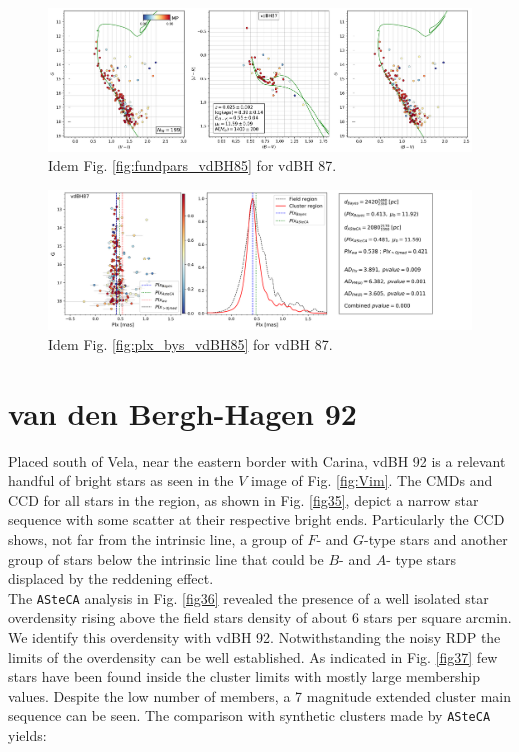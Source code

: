 \documentclass[draft]{aa}
\begin{document}
\begin{figure}[ht]
    \centering
    \includegraphics[width=\hsize]{../figs/cmds_vdbh87.png}
    \caption{Idem Fig. \ref{fig:fundpars_vdBH85} for vdBH 87.}
    \label{fig17}
\end{figure}
\begin{figure}[ht]
    \centering
    \includegraphics[width=\hsize]{../figs/plx_vdBH87.png}
    \caption{Idem Fig. \ref{fig:plx_bys_vdBH85} for vdBH 87.}
    \label{fig18}
\end{figure}




\section{van den Bergh-Hagen 92}

Placed south of Vela, near the eastern border with Carina, vdBH
92 is a relevant handful of bright stars as seen in the $V$ image of Fig.
\ref{fig:Vim}. The CMDs and CCD for all stars in the region, as shown in Fig.
\ref{fig35}, depict a narrow star sequence with some scatter at their respective
bright ends. Particularly the CCD shows, not far from the intrinsic line, a
group of $F$- and $G$-type stars and another group of stars below the intrinsic
line that could be $B$- and $A$- type stars displaced by the reddening effect.\\

The \texttt{ASteCA} analysis in Fig. \ref{fig36} revealed the presence of a
well isolated star overdensity rising above the field stars density of about 6
stars per square arcmin. We identify this overdensity with vdBH
92. Notwithstanding the noisy RDP the limits of the overdensity can be well
established. As indicated in Fig. \ref{fig37} few stars have been found inside
the cluster limits with mostly large membership values. Despite the
low number of members, a 7 magnitude extended cluster main sequence can be
seen. The comparison with synthetic clusters made by \texttt{ASteCA} yields:
\end{document}
